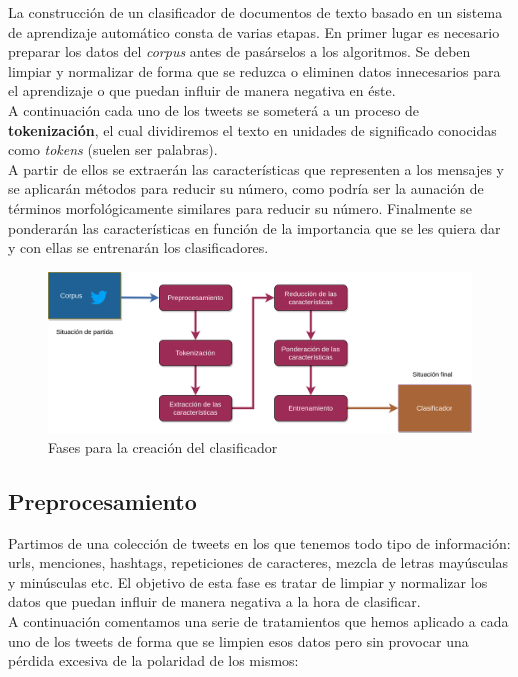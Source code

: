 \documentclass[a4paper,12pt]{report}
\begin{document}
{\setlength{\parindent}{0cm}
La construcción de un clasificador de documentos de texto basado en un sistema de aprendizaje automático consta de varias etapas. En primer lugar es necesario preparar los datos del \textit{corpus} antes de pasárselos a los algoritmos. Se deben limpiar y normalizar de forma que se reduzca o eliminen datos innecesarios para el aprendizaje o que puedan influir de manera negativa en éste.}
\vspace{2mm}\\
A continuación cada uno de los tweets se someterá a un proceso de \textbf{tokenización}, el cual dividiremos el texto en unidades de significado conocidas como \textit{tokens} (suelen ser palabras).\vspace{2mm}\\
A partir de ellos se extraerán las características que representen a los mensajes y se aplicarán métodos para reducir su número, como podría ser la aunación de términos morfológicamente similares para reducir su número. Finalmente se ponderarán las características en función de la importancia que se les quiera dar y con ellas se entrenarán los clasificadores. 

\vspace{4mm}
\begin{figure}[htbp!]
\centering
\includegraphics[scale=0.65]{images/Fases_SA.png}
\caption{Fases para la creación del clasificador}
\end{figure}
\vspace{2mm}


\subsection{Preprocesamiento}

{\setlength{\parindent}{0cm}
Partimos de una colección de tweets en los que tenemos todo tipo de información: urls, menciones, hashtags, repeticiones de caracteres, mezcla de letras mayúsculas y minúsculas etc. El objetivo de esta fase es tratar de limpiar y normalizar los datos que puedan influir de manera negativa a la hora de clasificar. }
\vspace{2mm}\\
A continuación comentamos una serie de tratamientos que hemos aplicado a cada uno de los tweets de forma que se limpien esos datos pero sin provocar una pérdida excesiva de la polaridad de los mismos:
\end{document}
